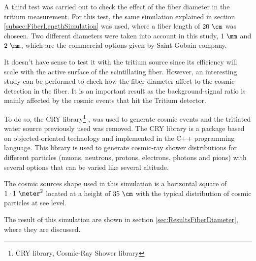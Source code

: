 A third test was carried out to check the effect of the fiber diameter in the tritium measurement. For this test, the same simulation explained in section \ref{subsec:FiberLengthSimulation} was used, where a fiber length of $20~\cm$ was choseen. Two different diameters were taken into account in this study, $1~\mm$ and $2~\mm$, which are the commercial options given by Saint-Gobain company.

It doesn't have sense to test it with the tritium source since its efficiency will scale with the active surface of the scintillating fiber. However, an interesting study can be performed to check how the fiber diameter affect to the cosmic detection in the fiber. It is an important result as the background-signal ratio is mainly affected by the cosmic events that hit the Tritium detector.

To do so, the CRY library\footnote{CRY library, Cosmic-Ray Shower library} \cite{CRYwebsite}, \cite{CRYpaper} was used to generate cosmic events and the tritiated water source previously used was removed. The CRY library is a package based on objected-oriented technology and implemented in the C++ programming language. This library is used to generate cosmic-ray shower distributions for different particles (muons, neutrons, protons, electrons, photons and pions) with several options that can be varied like several altitude.

The cosmic sources shape used in this simulation is a horizontal square of $1\cdot 1~\meter ^2$ located at a height of $35~\cm$ with the typical distribution of cosmic particles at see level.

The result of this simulation are shown in section \ref{sec:ResultsFiberDiameter}, where they are discussed.